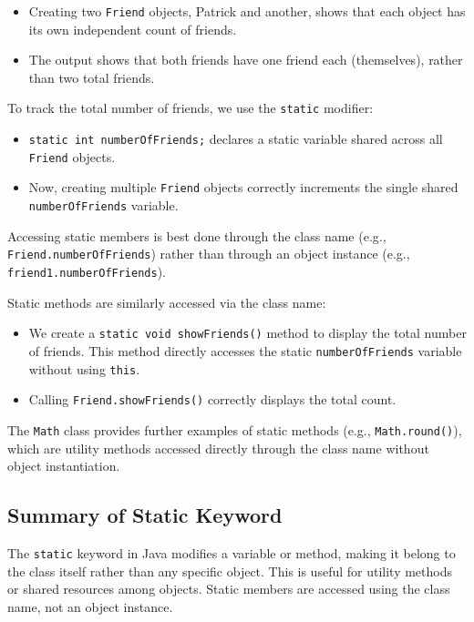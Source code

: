 \documentclass{article}
\begin{document}
\begin{itemize}
    \item Creating two \texttt{Friend} objects, Patrick and another, shows that each object has its own independent count of friends.
    \item The output shows that both friends have one friend each (themselves), rather than two total friends.
\end{itemize}

To track the total number of friends, we use the \texttt{static} modifier:

\begin{itemize}
    \item \texttt{static int numberOfFriends;} declares a static variable shared across all \texttt{Friend} objects.
    \item Now, creating multiple \texttt{Friend} objects correctly increments the single shared \texttt{numberOfFriends} variable.
\end{itemize}

Accessing static members is best done through the class name (e.g., \texttt{Friend.numberOfFriends}) rather than through an object instance (e.g., \texttt{friend1.numberOfFriends}).

Static methods are similarly accessed via the class name:

\begin{itemize}
    \item We create a \texttt{static void showFriends()} method to display the total number of friends.  This method directly accesses the static \texttt{numberOfFriends} variable without using \texttt{this}.
    \item  Calling \texttt{Friend.showFriends()} correctly displays the total count.
\end{itemize}

The \texttt{Math} class provides further examples of static methods (e.g., \texttt{Math.round()}), which are utility methods accessed directly through the class name without object instantiation.

\subsection{Summary of Static Keyword}

The \texttt{static} keyword in Java modifies a variable or method, making it belong to the class itself rather than any specific object.  This is useful for utility methods or shared resources among objects.  Static members are accessed using the class name, not an object instance.
\end{document}
